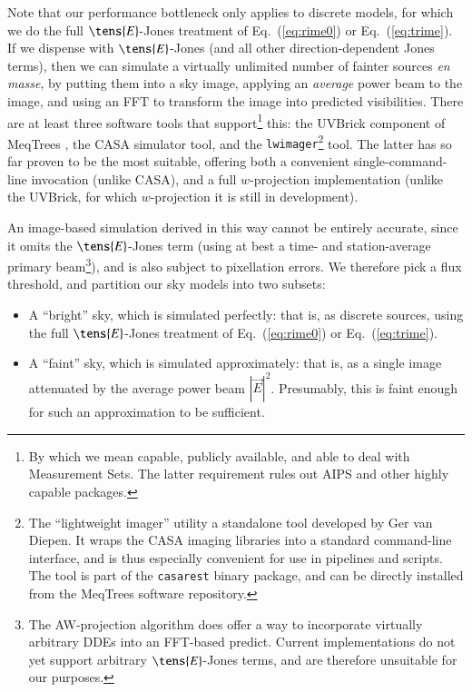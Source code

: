 \documentclass{aa}
\begin{document}
Note that our performance bottleneck only applies to discrete models, for which we do the full $\tens{E}$-Jones treatment of Eq.~(\ref{eq:rime0}) or Eq.~(\ref{eq:trime}). If we dispense with $\tens{E}$-Jones (and all other direction-dependent Jones terms), then we can simulate a virtually unlimited number of fainter sources \emph{en masse}, by putting them into a sky image, applying an \emph{average} power beam to the image, and using an FFT to transform the image into predicted visibilities. There are at least three software tools that support\footnote{By which we mean capable, publicly available, and able to deal with Measurement Sets. The latter requirement rules out AIPS and other highly capable packages.}  this: the UVBrick component of MeqTrees \citep{Abdalla:uvbrick}, the CASA simulator tool, and the {\tt lwimager}\footnote{The ``lightweight imager'' utility a standalone tool developed by Ger van Diepen. It wraps the CASA imaging libraries into a standard command-line interface, and is thus especially convenient for use in pipelines and scripts. The tool is part of the {\tt casarest} binary package, and can be directly installed from the MeqTrees software repository.} tool. The latter has so far proven to be the most suitable, offering both a convenient single-command-line invocation (unlike CASA), and a full $w$-projection \citep{Cornwell:wproj} implementation (unlike the UVBrick, for which $w$-projection it is still in development). 

An image-based simulation derived in this way cannot be entirely accurate, since it omits the $\tens{E}$-Jones term (using at best a time- and station-average primary beam\footnote{The AW-projection algorithm \citep{SB:imageplane} does offer a way to incorporate virtually arbitrary DDEs into an FFT-based predict. Current implementations do not yet support arbitrary $\tens{E}$-Jones terms, and are therefore unsuitable for our purposes.}), and is also subject to pixellation errors. We therefore pick a flux threshold, and partition our sky models into two subsets:

\begin{itemize}
  \item A ``bright'' sky, which is simulated perfectly: that is, as discrete sources, using the full $\tens{E}$-Jones treatment of Eq.~(\ref{eq:rime0}) or Eq.~(\ref{eq:trime}).
  \item A ``faint'' sky, which is simulated approximately: that is, as a single image attenuated by the average power beam $|\vec E|^2$. Presumably, this is faint enough for such an approximation to be sufficient.
\end{itemize}
\end{document}
